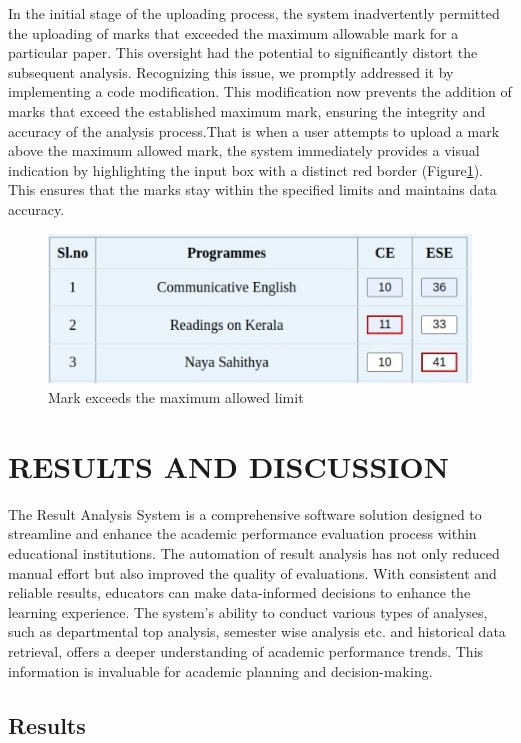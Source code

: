 \documentclass{nascproject}
\begin{document}
In the initial stage of the uploading process, the system inadvertently permitted the uploading of marks that exceeded the maximum allowable mark for a particular paper. This oversight had the potential to significantly distort the subsequent analysis. Recognizing this issue, we promptly addressed it by implementing a code modification. This modification now prevents the addition of marks that exceed the established maximum mark, ensuring the integrity and accuracy of the analysis process.That is when a user attempts to upload a mark above the maximum allowed mark, the system immediately provides a visual indication by highlighting the input box with a distinct red border (Figure\ref{testing}). This ensures that the marks stay within the specified limits and maintains data accuracy.


\begin{figure}
	\centering
	\includegraphics[width=1\linewidth]{testing.jpeg}
	\caption{Mark exceeds the maximum allowed limit}
	\label{testing}
\end{figure}
\chapter{RESULTS AND DISCUSSION}
The Result Analysis System is a comprehensive software solution designed to streamline and enhance the academic performance evaluation process within educational institutions. The automation of result analysis has not only reduced manual effort but also improved the quality of evaluations. With consistent and reliable results, educators can make data-informed decisions to enhance the learning experience. The system's ability to conduct various types of analyses, such as departmental top analysis, semester wise analysis etc. and historical data retrieval, offers a deeper understanding of academic performance trends. This information is invaluable for academic planning and decision-making.
\section{Results}
\end{document}
